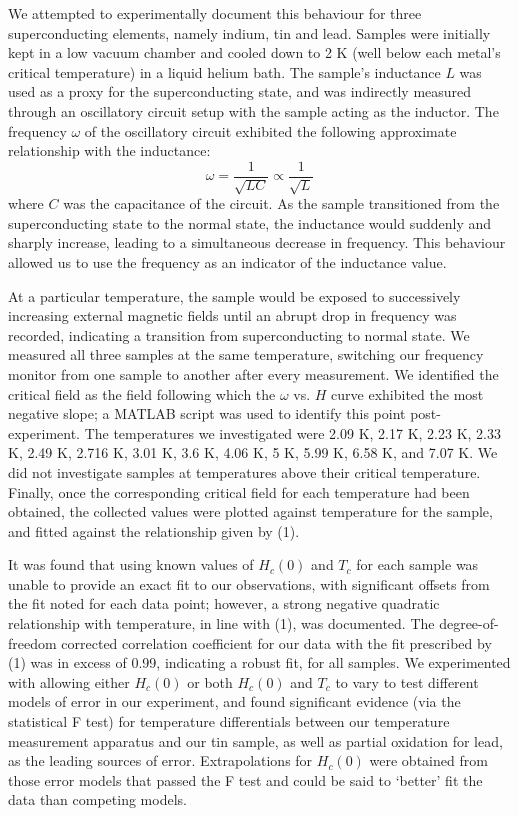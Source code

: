 \documentclass[aps,prl,nofootinbib,twocolumn,superscriptaddress,groupedaddress]{revtex4}  %
\begin{document}
We attempted to experimentally document this behaviour for three superconducting elements, namely indium, tin and lead. Samples were initially kept in a low vacuum chamber and cooled down to 2 K (well below each metal's critical temperature) in a liquid helium bath. The sample's inductance $L$ was used as a proxy for the superconducting state, and was indirectly measured through an oscillatory circuit setup with the sample acting as the inductor. The frequency $\omega$ of the oscillatory circuit exhibited the following approximate relationship with the inductance:
$$ \omega = \frac{1}{\sqrt{LC}} \propto \frac{1}{\sqrt{L}}$$ where $C$ was the capacitance of the circuit. As the sample transitioned from the superconducting state to the normal state, the inductance would suddenly and sharply increase, leading to a simultaneous decrease in frequency. This behaviour allowed us to use the frequency as an indicator of the inductance value.

At a particular temperature, the sample would be exposed to successively increasing external magnetic fields until an abrupt drop in frequency was recorded, indicating a transition from superconducting to normal state. We measured all three samples at the same temperature, switching our frequency monitor from one sample to another after every measurement. We identified the critical field as the field following which the $\omega$ vs. $H$ curve exhibited the most negative slope; a MATLAB script was used to identify this point post-experiment. The temperatures we investigated were 2.09 K, 2.17 K, 2.23 K, 2.33 K, 2.49 K, 2.716 K, 3.01 K, 3.6 K, 4.06 K, 5 K, 5.99 K, 6.58 K, and 7.07 K. We did not investigate samples at temperatures above their critical temperature. Finally, once the corresponding critical field for each temperature had been obtained, the collected values were plotted against temperature for the sample, and fitted against the  relationship given by (1). 

It was found that using known values of $H_{c}(0)$ and $T_{c}$ for each sample was unable to provide an exact fit to our observations, with significant offsets from the fit noted for each data point; however, a strong negative quadratic relationship with temperature, in line with (1), was documented. The degree-of-freedom corrected correlation coefficient for our data with the fit prescribed by (1) was in excess of 0.99, indicating a robust fit, for all samples. We experimented with allowing either $H_{c}(0)$ or both $H_{c}(0)$ and $T_{c}$ to vary to test different models of error in our experiment, and found significant evidence (via the statistical F test) for temperature differentials between our temperature measurement apparatus and our tin sample, as well as partial oxidation for lead, as the leading sources of error. Extrapolations for $H_{c}(0)$ were obtained from those error models that passed the F test and could be said to `better' fit the data than competing models.
\end{document}

